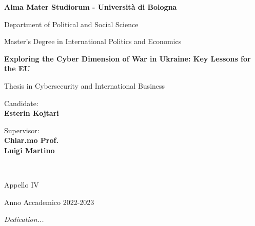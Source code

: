 \documentclass[12pt,a4paper]{report}
\newcommand{\ag}{\`a}
\begin{document}
\title{}
\author{Esterin Kojtari}
\date{8th February 2024}

\begin{titlepage}
    \begin{center}
        \vspace*{0.2cm}
        {\fontsize{19pt}{20pt}\selectfont \textbf{Alma Mater Studiorum - Universit{\ag} di Bologna}\par}
    
        \noindent\hrulefill
        \vspace{0.8cm}
        
        \Large
        
        Department of Political and Social Science
        
        Master's Degree in International Politics and Economics
        
        \Large
        \vspace{5cm}
        {\fontsize{21pt}{20}\textcolor{MyDarkBlue}{\textbf{Exploring the Cyber Dimension of War in Ukraine: Key Lessons for the EU}}}

        
        \vspace{1cm}
        {\fontsize{16pt}{16pt}Thesis in Cybersecurity and International Business}
        
        \vspace{4.5cm}
        \begin{minipage}[t]{0.34\textwidth}
        \begin{flushleft}
        {\fontsize{16pt}{16pt}Candidate: \\ \textbf{\textcolor{MyDarkBlue}{Esterin Kojtari}}}
        \end{flushleft}
        \end{minipage}
        \begin{minipage}[t]{0.64\textwidth}
        \begin{flushright} \Large
        Supervisor: \\
        \textbf{\textcolor{MyDarkBlue}{Chiar.mo Prof.}} \\ \textbf{\textcolor{MyDarkBlue}{Luigi Martino}} 
        \end{flushright}
        \end{minipage}\\
        
        \vfill
        \noindent\hrulefill
        \vspace{0.3cm}
        \Large
        
        Appello {\textcolor{MyDarkBlue} {IV}} 
        
        Anno Accademico {\textcolor{MyDarkBlue} {2022-2023}}
    \end{center}
\end{titlepage}
\restoregeometry
\vspace*{5cm}
\begin{flushright}
  {\parbox{4.2cm}{\textit{Dedication...}}}
\end{flushright}
\end{document}
